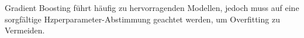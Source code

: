 Gradient Boosting führt häufig zu hervorragenden Modellen, jedoch muss auf eine sorgfältige Hzperparameter-Abstimmung geachtet werden, um Overfitting zu Vermeiden. \cite{Hastie2009}


